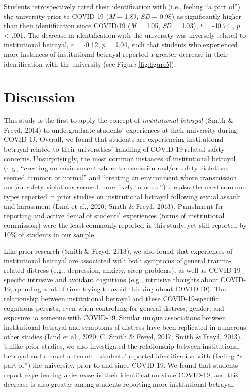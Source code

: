 \documentclass[
  english,
  man, noextraspace]{apa6}
\begin{document}
Students retrospectively rated their identification with (i.e., feeling \enquote{a part of}) the university prior to COVID-19 (\emph{M} = 1.89, \emph{SD} = 0.98) as significantly higher than their identification since COVID-19 (\emph{M} = 1.05, \emph{SD} = 1.03), \emph{t} = -10.74 , \emph{p} = \textless{} .001. The decrease in identification with the university was inversely related to institutional betrayal, \emph{r} = -0.12, \emph{p} = 0.04, such that students who experienced more instances of institutional betrayal reported a greater decrease in their identification with the university (see Figure \ref{fig:figure5}).

\hypertarget{discussion}{%
\section{Discussion}\label{discussion}}

This study is the first to apply the concept of \emph{institutional betrayal} (Smith \& Freyd, 2014) to undergraduate students' experiences at their university during COVID-19. Overall, we found that students are experiencing institutional betrayal related to their universities' handling of COVID-19-related safety concerns. Unsurprisingly, the most common instances of institutional betrayal (e.g., \enquote{creating an environment where transmission and/or safety violations seemed common or normal} and \enquote{creating an environment where transmission and/or safety violations seemed more likely to occur}) are also the most common types reported in prior studies on institutional betrayal following sexual assault and harassment (Lind et al., 2020; Smith \& Freyd, 2013). Punishment for reporting and active denial of students' experiences (forms of institutional commission) were the least commonly reported in this study, yet still reported by 10\% of students in our sample.

Like prior research (Smith \& Freyd, 2013), we also found that experiences of institutional betrayal are associated with both symptoms of general trauma-related distress (e.g., depression, anxiety, sleep problems), as well as COVID-19-specific intrusive and avoidant cognitions (e.g., intrusive thoughts about COVID-19, spending a lot of time trying to avoid thinking about COVID-19). The relationship between institutional betrayal and these COVID-19-specific cognitions persists, even when controlling for general distress, gender, and exposure to someone with COVID-19. Similar unique associations between institutional betrayal and symptoms of distress have been replicated in numerous other studies (Lind et al., 2020; C. Smith \& Freyd, 2017; Smith \& Freyd, 2013). Unlike prior studies, we also investigated the relationship between institutional betrayal and a novel outcome -- students' reported identification with (feeling \enquote{a part of}) the university, prior to and since COVID-19. We found that students report experiencing a decrease in their identification since COVID-19, and this decrease is also greater among students reporting more institutional betrayal.
\end{document}
